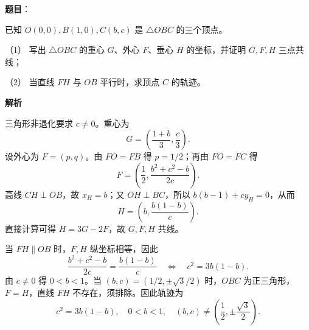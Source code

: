 \begin{answer}

\textbf{题目}：

已知 \(O(0,0),B(1,0),C(b,c)\) 是 \(\triangle OBC\) 的三个顶点。

（1） 写出 \(\triangle OBC\) 的重心 \(G\)、外心 \(F\)、垂心 \(H\) 的坐标，并证明 \(G,F,H\) 三点共线；

（2） 当直线 \(FH\) 与 \(OB\) 平行时，求顶点 \(C\) 的轨迹。

\textbf{解析}


三角形非退化要求 \(c\ne0\)。重心为
\nopagebreak[4]
\[
G=\left(\frac{1+b}{3},\frac c3\right).
\]
设外心为 \(F=(p,q)\)。由 \(FO=FB\) 得 \(p=1/2\)；再由 \(FO=FC\) 得
\nopagebreak[4]
\[
F=\left(\frac12,\frac{b^2+c^2-b}{2c}\right).
\]
高线 \(CH\perp OB\)，故 \(x_H=b\)；又 \(OH\perp BC\)，所以 \(b(b-1)+cy_H=0\)，从而
\nopagebreak[4]
\[
H=\left(b,\frac{b(1-b)}c\right).
\]
直接计算可得 \(H=3G-2F\)，故 \(G,F,H\) 共线。


当 \(FH\parallel OB\) 时，\(F,H\) 纵坐标相等，因此
\nopagebreak[4]
\[
\frac{b^2+c^2-b}{2c}=\frac{b(1-b)}c
\quad\Longleftrightarrow\quad
c^2=3b(1-b).
\]
由 \(c\ne0\) 得 \(0<b<1\)。当 \((b,c)=(1/2,\pm\sqrt3/2)\) 时，\(OBC\) 为正三角形，\(F=H\)，直线 \(FH\) 不存在，须排除。因此轨迹为
\nopagebreak[4]
\[
c^2=3b(1-b),\quad 0<b<1,\quad (b,c)\ne\left(\frac12,\pm\frac{\sqrt3}{2}\right).
\]



\end{answer}
